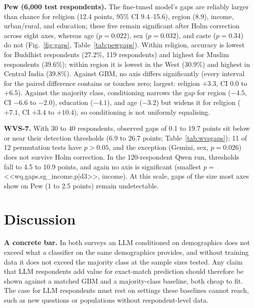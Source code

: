 \documentclass[conference]{IEEEtran}
\begin{document}
\textbf{Pew (6{,}000 test respondents).} The fine-tuned model's gaps are reliably larger than chance for religion (12.4 points, 95\% CI 9.4--15.6), region (8.9), income, urban/rural, and education; these five remain significant after Holm correction across eight axes, whereas age ($p=0.022$), sex ($p=0.032$), and caste ($p=0.34$) do not (Fig.~\ref{fig:gaps}, Table~\ref{tab:pewgaps}). Within religion, accuracy is lowest for Buddhist respondents (27.2\%, 119 respondents) and highest for Muslim respondents (39.6\%); within region it is lowest in the West (30.9\%) and highest in Central India (39.8\%). Against GBM, no axis differs significantly (every interval for the paired difference contains or touches zero; largest: religion $+3.3$, CI 0.0 to $+6.5$). Against the majority class, conditioning narrows the gap for region ($-4.5$, CI $-6.6$ to $-2.0$), education ($-4.1$), and age ($-3.2$) but widens it for religion ($+7.1$, CI $+3.4$ to $+10.4$), so conditioning is not uniformly equalising.

\begin{table}[!t]
\caption{WVS-7 subgroup gaps in accuracy points, with permutation $p$ in parentheses and the detection threshold $\mathrm{Null}_{95}$ in brackets. Column headers give the number of respondents.}
\label{tab:wvsgaps}
\centering
\scriptsize

\end{table}

\textbf{WVS-7.} With 30 to 40 respondents, observed gaps of 0.1 to 19.7 points sit below or near their detection thresholds (6.9 to 26.7 points; Table~\ref{tab:wvsgaps}); 11 of 12 permutation tests have $p>0.05$, and the exception (Gemini, sex, $p=0.026$) does not survive Holm correction. In the 120-respondent Qwen run, thresholds fall to 4.5 to 10.9 points, and again no axis is significant (smallest $p=$ <<wq.gaps.sg_income.p|d3>>, income). At this scale, gaps of the size most axes show on Pew (1 to 2.5 points) remain undetectable.

\section{Discussion}

\textbf{A concrete bar.} In both surveys an LLM conditioned on demographics does not exceed what a classifier on the same demographics provides, and without training data it does not exceed the majority class at the sample sizes tested. Any claim that LLM respondents add value for exact-match prediction should therefore be shown against a matched GBM and a majority-class baseline, both cheap to fit. The case for LLM respondents must rest on settings these baselines cannot reach, such as new questions or populations without respondent-level data.
\end{document}
